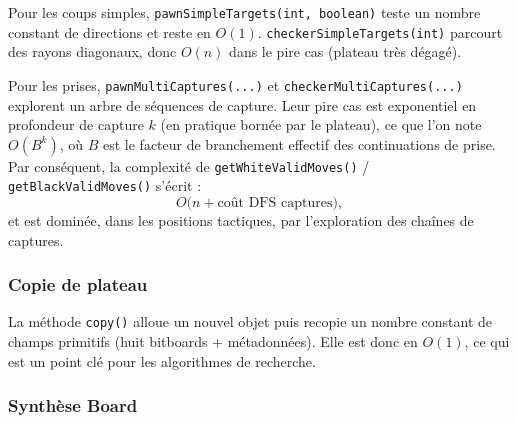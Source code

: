 \documentclass[a4paper]{article}
\begin{document}
Pour les coups simples, \texttt{pawnSimpleTargets(int, boolean)} teste un nombre constant de directions et reste en $O(1)$.
\texttt{checkerSimpleTargets(int)} parcourt des rayons diagonaux, donc $O(n)$ dans le pire cas (plateau très dégagé).

Pour les prises, \texttt{pawnMultiCaptures(...)} et \texttt{checkerMultiCaptures(...)} explorent un arbre de séquences
de capture. Leur pire cas est exponentiel en profondeur de capture $k$ (en pratique bornée par le plateau), ce que l'on note
$O(B^k)$, où $B$ est le facteur de branchement effectif des continuations de prise. Par conséquent, la complexité de
\texttt{getWhiteValidMoves()} / \texttt{getBlackValidMoves()} s'écrit :
$$O\bigl(n + \text{coût DFS captures}\bigr),$$
et est dominée, dans les positions tactiques, par l'exploration des chaînes de captures.

\subsubsection{Copie de plateau}

La méthode \texttt{copy()} alloue un nouvel objet puis recopie un nombre constant de champs primitifs
(huit bitboards + métadonnées). Elle est donc en $O(1)$, ce qui est un point clé pour les algorithmes de recherche.

\subsubsection{Synthèse Board}
\end{document}
